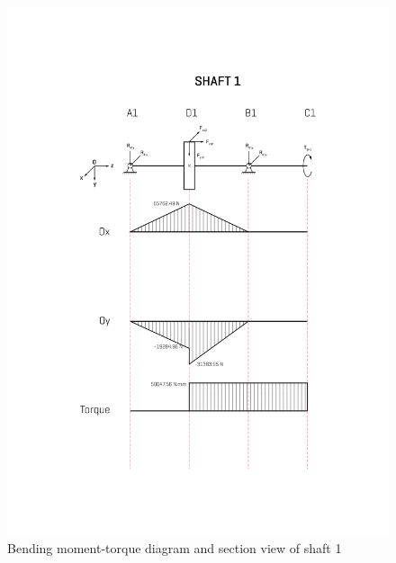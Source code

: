 \begin{figure}[ht]
	\centering
	\includegraphics[width=0.68\linewidth]{mshaft1}
	\caption{Bending moment-torque diagram and section view of shaft 1}
	\label{mshaft1}
\end{figure}

